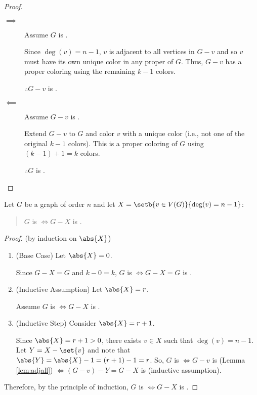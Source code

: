 \begin{proof}
  \begin{description}
  \item[]
  \item[\(\implies\)] Assume \(G\) is .

    Since \(\deg(v)=n-1\), \(v\) is adjacent to all vertices in \(G-v\) and so \(v\) must have its own unique color in any
    proper  of \(G\).  Thus, \(G-v\) has a proper coloring using the remaining \(k-1\) colors.

    \(\therefore G-v\) is .
    
  \item[\(\impliedby\)] Assume \(G-v\) is .

    Extend \(G-v\) to \(G\) and color \(v\) with a unique color (i.e., not one of the original \(k-1\) colors).  This is a
    proper coloring of \(G\) using \((k-1)+1=k\) colors.

    \(\therefore G\) is .
  \end{description}
\end{proof}

\begin{corollary}
  \label{cor:adjall}
  Let \(G\) be a graph of order \(n\) and let \(X=\setb{v\in V(G)}{\deg(v)=n-1}\):
  \begin{quote}
    \(G\) is  \(\iff G-X\) is .
  \end{quote}
\end{corollary}

\begin{proof}
  (by induction on \(\abs{X}\))
  \begin{enumerate}
  \item (Base Case) Let \(\abs{X}=0\).

    Since \(G-X=G\) and \(k-0=k\), \(G\) is  \(\iff G-X=G\) is .

  \item (Inductive Assumption) Let \(\abs{X}=r\).

    Assume \(G\) is  \(\iff G-X\) is .

  \item (Inductive Step) Consider \(\abs{X}=r+1\).
    
    Since \(\abs{X}=r+1>0\), there exists \(v\in X\) such that \(\deg(v)=n-1\).  Let \(Y=X-\set{v}\) and note that
    \(\abs{Y}=\abs{X}-1=(r+1)-1=r\).  So, \(G\) is  \(\iff G-v\) is  (Lemma \ref{lem:adjall})
    \(\iff (G-v)-Y=G-X\) is  (inductive assumption).
  \end{enumerate}

  Therefore, by the principle of induction, \(G\) is  \(\iff G-X\) is .
\end{proof}

